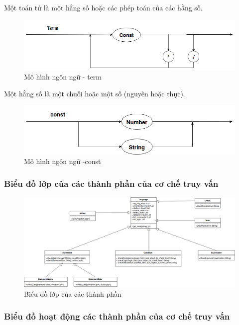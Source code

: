 Một toán tử là một hằng số hoặc các phép toán của các hằng số.
\begin{figure}[h!]
	\center
	\includegraphics[scale=0.4]{image/language_model-term}
	\caption{Mô hình ngôn ngữ - term}
\end{figure}

Một hằng số là một chuỗi hoặc một số (nguyên hoặc thực).
\begin{figure}[h!]
	\center
	\includegraphics[scale=0.4]{image/language_model-const}	
	\caption{Mô hình ngôn ngữ -const}
\end{figure}
\clearpage

\subsubsection{Biểu đồ lớp của các thành phần của cơ chế truy vấn}

\begin{figure}[h!]
	\center
	\includegraphics[scale=0.4]{image/language_diagram-class_diagram}	
	\caption{Biểu đồ lớp của các thành phần}
\end{figure}




\subsubsection{Biểu đồ hoạt động các thành phần của cơ chế truy vấn}

